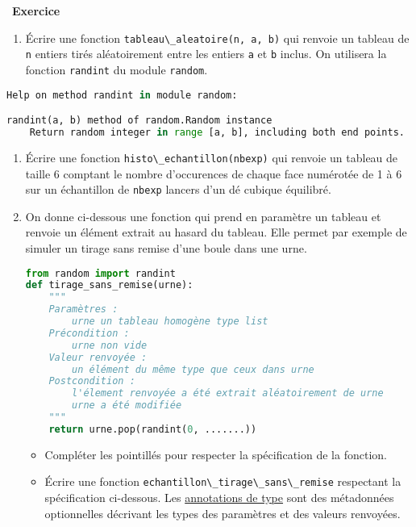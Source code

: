 \documentclass[
  11pt,
]{article}
\newcommand{\passthrough}[1]{#1}
\providecommand{\tightlist}{%
  \setlength{\itemsep}{0pt}\setlength{\parskip}{0pt}}
\newcounter{exo}
\newenvironment{exercice}[1]
{\par \medskip   \addtocounter{exo}{1} \noindent  
\begin{bclogo}[arrondi =0.1,   noborder = true, logo=\bccrayon, marge=4]{~\textbf{Exercice} \textbf{\theexo} {\itshape #1} }  \par}
{
\end{bclogo}
 \par \bigskip }
\newcounter{def}
\newcounter{histo}
\begin{document}
\begin{exercice}{}

\begin{enumerate}
\def\labelenumi{\arabic{enumi}.}
\tightlist
\item
  Écrire une fonction
  \passthrough{\lstinline!tableau\_aleatoire(n, a, b)!} qui renvoie un
  tableau de \passthrough{\lstinline!n!} entiers tirés aléatoirement
  entre les entiers \passthrough{\lstinline!a!} et
  \passthrough{\lstinline!b!} inclus. On utilisera la fonction
  \passthrough{\lstinline!randint!} du module
  \passthrough{\lstinline!random!}.
\end{enumerate}

\begin{lstlisting}[language=Python]
Help on method randint in module random:

randint(a, b) method of random.Random instance
    Return random integer in range [a, b], including both end points.
\end{lstlisting}

\begin{enumerate}
\def\labelenumi{\arabic{enumi}.}
\setcounter{enumi}{1}
\item
  Écrire une fonction
  \passthrough{\lstinline!histo\_echantillon(nbexp)!} qui renvoie un
  tableau de taille 6 comptant le nombre d'occurences de chaque face
  numérotée de 1 à 6 sur un échantillon de
  \passthrough{\lstinline!nbexp!} lancers d'un dé cubique équilibré.
\item
  On donne ci-dessous une fonction qui prend en paramètre un tableau et
  renvoie un élément extrait au hasard du tableau. Elle permet par
  exemple de simuler un tirage sans remise d'une boule dans une urne.

\begin{lstlisting}[language=Python]
from random import randint
def tirage_sans_remise(urne):
    """ 
    Paramètres :
        urne un tableau homogène type list
    Précondition :
        urne non vide
    Valeur renvoyée :
        un élément du même type que ceux dans urne
    Postcondition :
        l'élement renvoyée a été extrait aléatoirement de urne
        urne a été modifiée
    """
    return urne.pop(randint(0, .......))
\end{lstlisting}

  \begin{itemize}
  \tightlist
  \item
    Compléter les pointillés pour respecter la spécification de la
    fonction.
  \item
    Écrire une fonction
    \passthrough{\lstinline!echantillon\_tirage\_sans\_remise!}
    respectant la spécification ci-dessous. Les
    \href{https://docs.python.org/fr/3/tutorial/controlflow.html\#function-annotations}{annotations
    de type} sont des métadonnées optionnelles décrivant les types des
    paramètres et des valeurs renvoyées.
  \end{itemize}


\end{enumerate}
\end{exercice}
\end{document}
